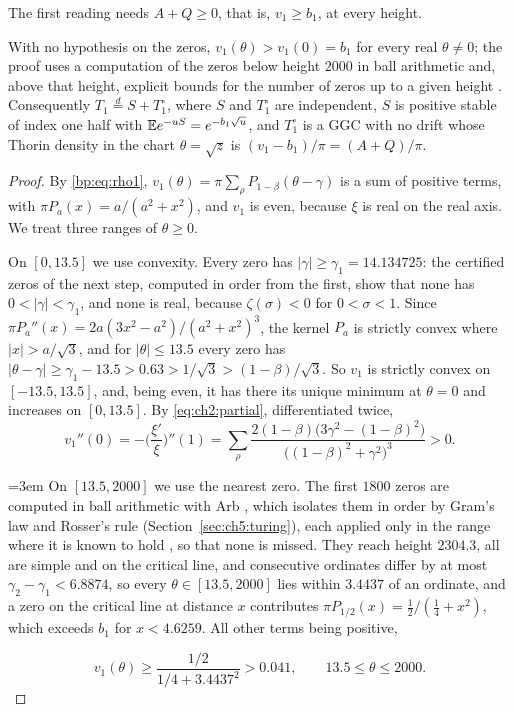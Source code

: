 The first reading needs $A+Q\ge0$, that is, $v_1\ge b_1$, at every height.

\begin{proposition}\label{bp:prop:v1min}
With no hypothesis on the zeros, $v_1(\theta)>v_1(0)=b_1$ for every real $\theta\ne0$; the proof uses a computation of the zeros below height $2000$ in ball arithmetic and, above that height, explicit bounds for the number of zeros up to a given height \cite{HSW22,Backlund}. Consequently $T_1\stackrel d=S+T_1^\circ$, where $S$ and $T_1^\circ$ are independent, $S$ is positive stable of index one half with $\mathbb{E} e^{-uS}=e^{-b_1\sqrt u}$, and $T_1^\circ$ is a GGC with no drift whose Thorin density in the chart $\theta=\sqrt z$ is $(v_1-b_1)/\pi=(A+Q)/\pi$.
\end{proposition}

\begin{proof}
By \eqref{bp:eq:rho1}, $v_1(\theta)=\pi\sum_\rho P_{1-\beta}(\theta-\gamma)$ is a sum of positive terms, with $\pi P_a(x)=a/(a^2+x^2)$, and $v_1$ is even, because $\xi$ is real on the real axis. We treat three ranges of $\theta\ge0$.

On $[0,13.5]$ we use convexity. Every zero has $|\gamma|\ge\gamma_1=14.134725$: the certified zeros of the next step, computed in order from the first, show that none has $0<|\gamma|<\gamma_1$, and none is real, because $\zeta(\sigma)<0$ for $0<\sigma<1$. Since $\pi P_a''(x)=2a(3x^2-a^2)/(a^2+x^2)^3$, the kernel $P_a$ is strictly convex where $|x|>a/\sqrt3$, and for $|\theta|\le13.5$ every zero has $|\theta-\gamma|\ge\gamma_1-13.5>0.63>1/\sqrt3>(1-\beta)/\sqrt3$. So $v_1$ is strictly convex on $[-13.5,13.5]$, and, being even, it has there its unique minimum at $\theta=0$ and increases on $[0,13.5]$. By \eqref{eq:ch2:partial}, differentiated twice,
\[
v_1''(0)=-\Big(\frac{\xi'}\xi\Big)''(1)=\sum_\rho\frac{2(1-\beta)\big(3\gamma^2-(1-\beta)^2\big)}{\big((1-\beta)^2+\gamma^2\big)^3}>0 .
\]

\begingroup\emergencystretch=3em
On $[13.5,2000]$ we use the nearest zero. The first $1800$ zeros are computed in ball arithmetic with Arb \cite{Arb}, which isolates them in order by Gram's law and Rosser's rule (Section~\ref{sec:ch5:turing}), each applied only in the range where it is known to hold \cite[Section 3]{Brent79}, so that none is missed. They reach height $2304.3$, all are simple and on the critical line, and consecutive ordinates differ by at most $\gamma_2-\gamma_1<6.8874$, so every $\theta\in[13.5,2000]$ lies within $3.4437$ of an ordinate, and a zero on the critical line at distance $x$ contributes $\pi P_{1/2}(x)=\frac12/(\frac14+x^2)$, which exceeds $b_1$ for $x<4.6259$. All other terms being positive,\par\endgroup
\[
v_1(\theta)\ge\frac{1/2}{1/4+3.4437^2}>0.041,\qquad 13.5\le\theta\le2000 .
\]


\end{proof}
